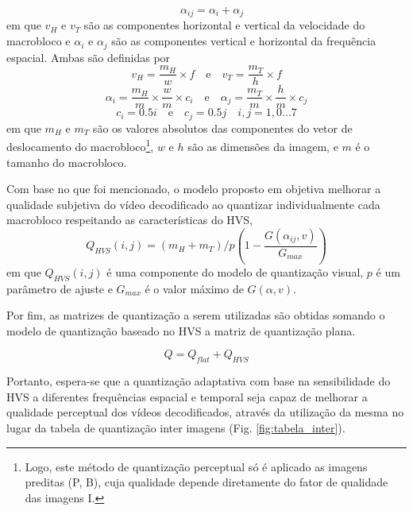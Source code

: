 \begin{equation}
\quad \alpha_{ij} = \alpha_i + \alpha_j
\end{equation}
em que $ v_H $ e $ v_T $ são as componentes horizontal e vertical da velocidade do macrobloco e $ \alpha_i $ e $ \alpha_j $ são as componentes vertical e horizontal da frequência espacial. Ambas são definidas por
\begin{equation}
v_H = \frac{m_H}{w} \times f \quad \textrm{e} \quad v_T = \frac{m_T}{h} \times f
\end{equation}
\begin{equation}
\alpha_i = \frac{m_H}{m} \times \frac{w}{m} \times c_i \quad \textrm{e} \quad \alpha_j = \frac{m_T}{m} \times \frac{h}{m} \times c_j
\end{equation}
\begin{equation}
c_i = 0.5i \quad \textrm{e} \quad c_j = 0.5j \quad i,j = 1,0...7
\end{equation}
em que $ m_H $ e $ m_T $ são os valores absolutos das componentes do vetor de deslocamento do macrobloco\footnote{Logo, este método de quantização perceptual só é aplicado as imagens preditas (P, B), cuja qualidade depende diretamente do fator de qualidade das imagens I.}, $w$ e $h$ são as dimensões da imagem, e $m$ é o tamanho do macrobloco.

Com base no que foi mencionado, o modelo proposto em \cite{Li_humanvisual} objetiva melhorar a qualidade subjetiva do vídeo decodificado ao quantizar individualmente cada macrobloco respeitando as características do HVS,
\begin{equation}
\label{eq_qhvs}
Q_{HVS}(i,j) = (m_{H} + m_{T})/p \left( 1 - \frac{ G(\alpha_{ij},v) }{G_{max}} \right)
\end{equation}
em que $ Q_{HVS}(i,j) $ é uma componente do modelo de quantização visual, $ p $ é um parâmetro de ajuste e $ G_{max} $ é o valor máximo de $ G(\alpha, v) $.

Por fim, as matrizes de quantização a serem utilizadas são obtidas somando o modelo de quantização baseado no HVS a matriz de quantização plana.

\begin{equation}\label{perceptual_quant}
Q = Q_{flat} + Q_{HVS}
\end{equation}

Portanto, espera-se que a quantização adaptativa com base na sensibilidade do HVS a diferentes frequências espacial e temporal seja capaz de melhorar a qualidade perceptual dos vídeos decodificados, através da utilização da mesma no lugar da tabela de quantização inter imagens (Fig. \ref{fig:tabela_inter}).